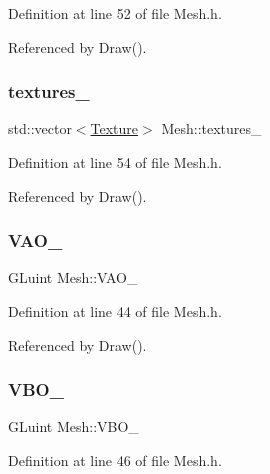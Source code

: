 Definition at line 52 of file Mesh.\+h.



Referenced by Draw().

\mbox{\label{classMesh_aac6b1a84f27f003bda8c4e48ffa4f475}} 
\subsubsection{\texorpdfstring{textures\+\_\+}{textures\_}}
{\footnotesize\ttfamily std\+::vector$<$\mbox{\hyperlink{structMesh_1_1Texture}{Texture}}$>$ Mesh\+::textures\+\_\+\hspace{0.3cm}{\ttfamily [private]}}



Definition at line 54 of file Mesh.\+h.



Referenced by Draw().

\mbox{\label{classMesh_afd9536b3c00a08e785c66bfbe9d8f576}} 
\subsubsection{\texorpdfstring{V\+A\+O\+\_\+}{VAO\_}}
{\footnotesize\ttfamily G\+Luint Mesh\+::\+V\+A\+O\+\_\+\hspace{0.3cm}{\ttfamily [private]}}



Definition at line 44 of file Mesh.\+h.



Referenced by Draw().

\mbox{\label{classMesh_aa0986a27c55d8ba1ecae7950bcc68b24}} 
\subsubsection{\texorpdfstring{V\+B\+O\+\_\+}{VBO\_}}
{\footnotesize\ttfamily G\+Luint Mesh\+::\+V\+B\+O\+\_\+\hspace{0.3cm}{\ttfamily [private]}}



Definition at line 46 of file Mesh.\+h.

